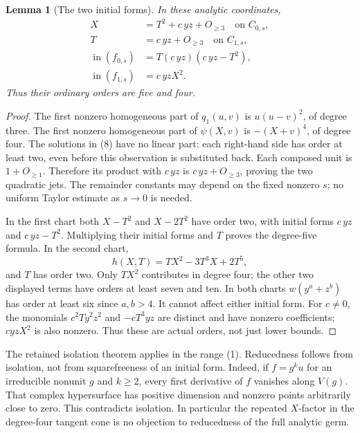 \documentclass[11pt]{article}
\newtheorem{lemma}[theorem]{Lemma}
\begin{document}
\begin{lemma}[The two initial forms]\label{lem:orders}
In these analytic coordinates,
\[
\begin{split}
X&=T^2+c\,yz+O_{\geq3}\quad\text{on }C_{0,s},\\
T&=c\,yz+O_{\geq3}\quad\text{on }C_{1,s},\\
\operatorname{in}(f_{0,s})&=T(c\,yz)(c\,yz-T^2),\\
\operatorname{in}(f_{1,s})&=c\,yzX^2.
\end{split}                                                       \tag{9}
\]
Thus their ordinary orders are five and four.
\end{lemma}

\begin{proof}
The first nonzero homogeneous part of \(q_1(u,v)\) is
\(u(u-v)^2\), of degree three. The first nonzero homogeneous part of
\(\psi(X,v)\) is \(-(X+v)^4\), of degree four.
The solutions in (8) have no linear part: each right-hand side has
order at least two, even before this observation is substituted back.
Each composed unit is \(1+O_{\geq1}\). Therefore its product with
\(c\,yz\) is \(c\,yz+O_{\geq3}\), proving the two quadratic jets.
The remainder constants may depend on the fixed nonzero \(s\);
no uniform Taylor estimate as \(s\to0\) is needed.

In the first chart both \(X-T^2\) and \(X-2T^2\) have order two, with
initial forms \(c\,yz\) and \(c\,yz-T^2\). Multiplying their initial
forms and \(T\) proves the degree-five formula. In the second chart,
\[
h(X,T)=TX^2-3T^3X+2T^5,
\]
and \(T\) has order two. Only \(TX^2\) contributes in degree four;
the other two displayed terms have orders at least seven and ten.
In both charts \(w(y^a+z^b)\) has order at least six since \(a,b>4\).
It cannot affect either initial form.
For \(c\ne0\), the monomials \(c^2Ty^2z^2\) and \(-cT^3yz\)
are distinct and have nonzero coefficients; \(cyzX^2\) is also
nonzero. Thus these are actual orders, not just lower bounds.
\end{proof}

The retained isolation theorem applies in the range (1).
Reducedness follows from isolation, not from squarefreeness of an
initial form. Indeed, if \(f=g^k u\) for an irreducible nonunit \(g\)
and \(k\geq2\), every first derivative of \(f\) vanishes along \(V(g)\).
That complex hypersurface has positive dimension and nonzero points
arbitrarily close to zero. This contradicts isolation.
In particular the repeated \(X\)-factor in the degree-four tangent
cone is no objection to reducedness of the full analytic germ.
\end{document}
